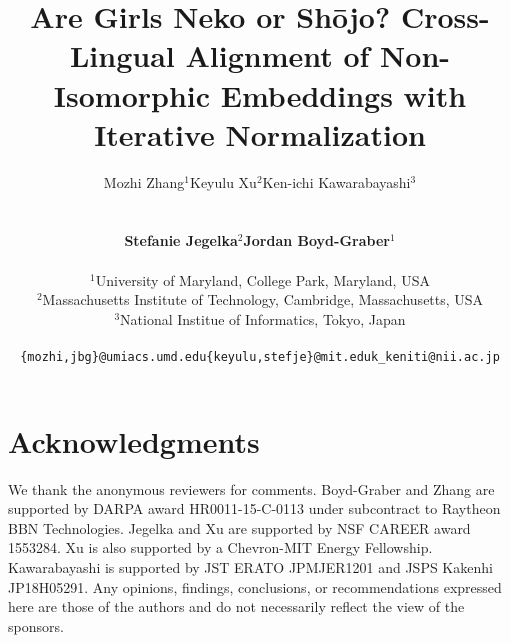 \documentclass[11pt,a4paper]{article}
\title{Are Girls Neko or Sh\={o}jo? Cross-Lingual Alignment of Non-Isomorphic Embeddings with Iterative Normalization}
\author{
  \begin{tabular}{ccc}
    Mozhi Zhang$^1$ & Keyulu Xu$^2$ & Ken-ichi Kawarabayashi$^3$
  \end{tabular}\\
  \begin{tabular}{cc}
    \textbf{Stefanie Jegelka$^2$} & \textbf{Jordan Boyd-Graber$^1$}
  \end{tabular}\\
  $^1$University of Maryland, College Park, Maryland, USA\\
  $^2$Massachusetts Institute of Technology, Cambridge, Massachusetts, USA\\
  $^3$National Institue of Informatics, Tokyo, Japan\\
  \begin{tabular}{ccc}
    {\small\tt \{mozhi,jbg\}@umiacs.umd.edu} & {\small\tt \{keyulu,stefje\}@mit.edu} & {\small\tt k\_keniti@nii.ac.jp}
  \end{tabular}
}
\newcommand{\latexfile}[1]{}
\begin{document}
\maketitle
\latexfile{00-abstract}
\latexfile{10-intro}
\latexfile{20-prelim}
\latexfile{30-property}
\latexfile{40-method}
\latexfile{50-experiment}
\latexfile{60-conclusion}

\section*{Acknowledgments}

We thank the anonymous reviewers for comments.
Boyd-Graber and Zhang are supported by DARPA award HR0011-15-C-0113 under
subcontract to Raytheon BBN Technologies.
Jegelka and Xu are supported by NSF CAREER award 1553284. Xu is also supported
by a Chevron-MIT Energy Fellowship. Kawarabayashi is supported by JST ERATO
JPMJER1201 and JSPS Kakenhi JP18H05291.
Any opinions, findings, conclusions, or recommendations expressed here are
those of the authors and do not necessarily reflect the view of the sponsors.

\clearpage




\clearpage
\begin{appendix}
  \latexfile{70-appendix}
\end{appendix}
\end{document}
